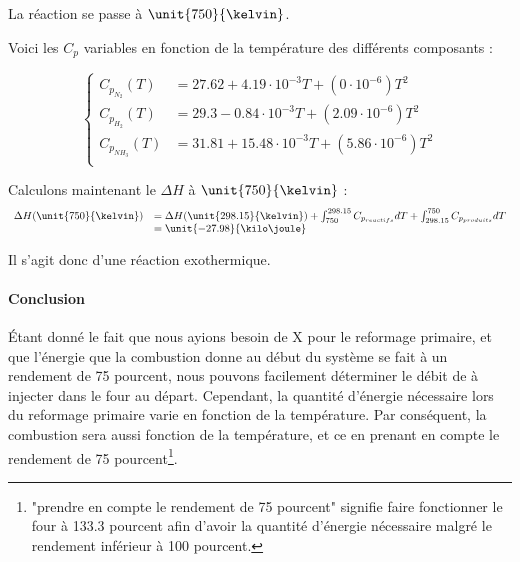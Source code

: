 La réaction se passe à $\unit{750}{\kelvin}$.
						
Voici les $C_p$ variables en fonction de la température des différents composants\cite{hc-table} :

$$
	\left\{
		\begin{array}{rl}
			C_{p_{N_2}}(T) 	&= 27.62 + 4.19\cdot10^{-3}T + (0\cdot10^{-6})T^2\\
			C_{p_{H_2}}(T)	&= 29.3 - 0.84\cdot10^{-3}T + (2.09\cdot10^{-6})T^2\\
			C_{p_{NH_3}}(T) 	&= 31.81 + 15.48\cdot10^{-3}T + (5.86\cdot10^{-6})T^2 \\
		\end{array}
	\right.
$$
					
Calculons maintenant le $\Delta H$ à $\unit{750}{\kelvin}$ :			
$$
	\begin{array}{rl}
		 	 \Delta H(\unit{750}{\kelvin})	&=  \Delta H(\unit{298.15}{\kelvin}) 
																							+ \int_{750}^{298.15} C_{p_{reactifs}} dT + \int_{298.15}^{750} C_{p_{produits}} dT \\
																				&=  \unit{-27.98}{\kilo\joule}
	\end{array}
$$	
	
Il s'agit donc d'une réaction exothermique.

\paragraph{Conclusion}
\'Etant donné le fait que nous ayions besoin de \unit{X}{\kilo\joule} pour le reformage primaire, et que l'énergie
que la combustion donne au début du système se fait à un rendement de 75 pourcent, nous pouvons facilement déterminer
le débit de  à injecter dans le four au départ. Cependant, la quantité d'énergie nécessaire lors du
reformage primaire varie en fonction de la température. Par conséquent, la combustion sera aussi fonction de la température,
et ce en prenant en compte le rendement de 75 pourcent\footnote{"prendre en compte le rendement de 75 pourcent" signifie faire
fonctionner le four à 133.3 pourcent afin d'avoir la quantité d'énergie nécessaire malgré le rendement inférieur 
à 100 pourcent.}.

